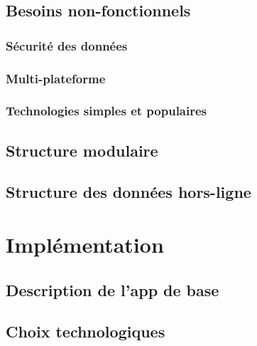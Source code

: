 \documentclass{EPL-master-thesis-covers-FR}
\begin{document}
			

		\section{Besoins non-fonctionnels}


			\subsection*{Sécurité des données}


			\subsection*{Multi-plateforme}
				

			\subsection*{Technologies simples et populaires}


		\section{Structure modulaire}
			\label{sec:modules}


			

		\section{Structure des données hors-ligne}
			\label{sec:data}


	\chapter{Implémentation}

		\section{Description de l'app de base}
		
		\section{Choix technologiques}
			\label{sec:choix_tech}
			
\end{document}
